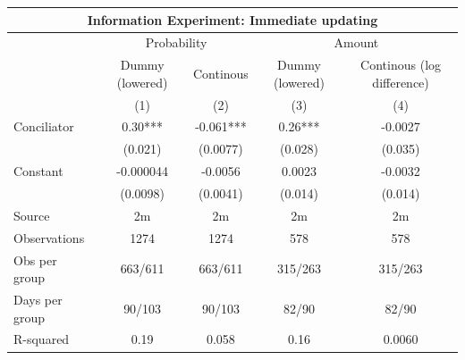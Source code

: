 \begin{tabular}{lcccc}
\toprule
\toprule
\multicolumn{5}{c}{\textbf{Information Experiment: Immediate updating}} \\
\midrule
      & \multicolumn{2}{c}{Probability} & \multicolumn{2}{c}{Amount } \\
\midrule
      & Dummy (lowered) & Continous & Dummy (lowered) & Continous (log difference) \\
\midrule
      & (1)   & (2)   & (3)   & (4) \\
Conciliator & 0.30*** & -0.061*** & 0.26*** & -0.0027 \\
      & (0.021) & (0.0077) & (0.028) & (0.035) \\
Constant & -0.000044 & -0.0056 & 0.0023 & -0.0032 \\
      & (0.0098) & (0.0041) & (0.014) & (0.014) \\
\midrule
Source & 2m    & 2m    & 2m    & 2m \\
Observations & 1274  & 1274  & 578   & 578 \\
Obs per group & 663/611 & 663/611 & 315/263 & 315/263 \\
Days per group & 90/103 & 90/103 & 82/90 & 82/90 \\
R-squared & 0.19  & 0.058 & 0.16  & 0.0060 \\
\bottomrule
\end{tabular}%
